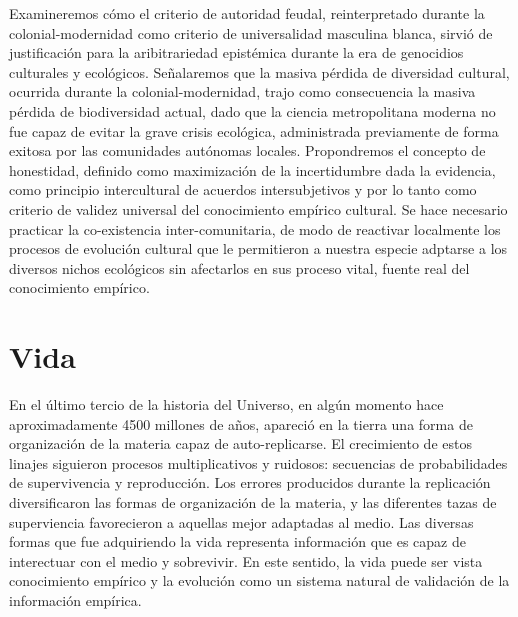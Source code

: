 \documentclass[a4paper,10pt]{book}
\theoremstyle{definition}
\begin{document}
Examineremos cómo el criterio de autoridad feudal, reinterpretado durante la colonial-modernidad como criterio de universalidad masculina blanca, sirvió de justificación para la aribitrariedad epistémica durante la era de genocidios culturales y ecológicos.
Señalaremos que la masiva pérdida de diversidad cultural, ocurrida durante la colonial-modernidad, trajo como consecuencia la masiva pérdida de biodiversidad actual, dado que la ciencia metropolitana moderna no fue capaz de evitar la grave crisis ecológica, administrada previamente de forma exitosa por las comunidades autónomas locales.
Propondremos el concepto de honestidad, definido como maximización de la incertidumbre dada la evidencia, como principio intercultural de acuerdos intersubjetivos y por lo tanto como criterio de validez universal del conocimiento empírico cultural.
Se hace necesario practicar la co-existencia inter-comunitaria, de modo de reactivar localmente los procesos de evolución cultural que le permitieron a nuestra especie adptarse a los diversos nichos ecológicos sin afectarlos en sus proceso vital, fuente real del conocimiento empírico.
 
\section{Vida}

En el último tercio de la historia del Universo, en algún momento hace aproximadamente 4500 millones de años, apareció en la tierra una forma de organización de la materia capaz de auto-replicarse.
El crecimiento de estos linajes siguieron procesos multiplicativos y ruidosos: secuencias de probabilidades de supervivencia y reproducción.
Los errores producidos durante la replicación diversificaron las formas de organización de la materia, y las diferentes tazas de superviencia favorecieron a aquellas mejor adaptadas al medio.
Las diversas formas que fue adquiriendo la vida representa información que es capaz de interectuar con el medio y sobrevivir.
En este sentido, la vida puede ser vista conocimiento empírico y la evolución como un sistema natural de validación de la información empírica.

\end{document}
